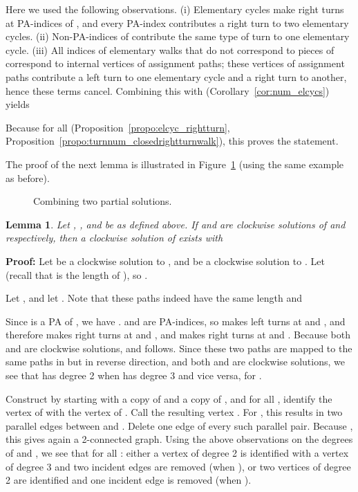 \documentclass{llncs}
\newcommand{\PF}{{\bf Proof: }}
\newcommand{\QED}{\hspace*{\fill}{}\medskip}
\newcommand{\Bo}{B'}
\newcommand{\Bt}{B''}
\newtheorem{lem}[thm]{Lemma}
\begin{document}
Here we used the following observations. (i) Elementary cycles make right turns at PA-indices of , and every PA-index contributes a right turn to two elementary cycles. (ii) Non-PA-indices of  contribute the same type of turn to one elementary cycle. (iii) All indices of elementary walks that do not correspond to pieces of  correspond to internal vertices of assignment paths; these vertices of assignment paths contribute a left turn to one elementary cycle and a right turn to another, hence these terms cancel.
Combining this with  (Corollary~\ref{cor:num_elcycs}) yields



Because  for all  (Proposition~\ref{propo:elcyc_rightturn}, Proposition~\ref{propo:turnnum_closedrightturnwalk}), this proves the statement.
\QED









\medskip

The proof of the next lemma is illustrated in Figure~\ref{fig:SGL} (using the same example as before).
\begin{figure}
\centering
\scalebox{0.9}{v'_1v'_3v'_2v''_2\Bt_x=v''_0v_0v_2v_4v''_1v''_3\Bo_0=v'_4v_3v_1\Bo_y=v''_4=\Bt_0v'_0H''H'H}
\caption{Combining two partial solutions.}
\label{fig:SGL}
\end{figure}
\begin{lem}
\label{lem:gluing-lemma}
Let , ,  and  be as defined above.
If  and  are clockwise solutions of  and  respectively, then a clockwise solution  of  exists with 

\end{lem}
\PF
Let  be a clockwise solution to , and  be a clockwise solution to . 
Let  (recall that  is the length of ), so .

Let , and let .
Note that these paths indeed have the same length  and

Since  is a PA of , we have .
 and  are PA-indices, so  makes left turns at  and , and therefore  makes right turns at  and , and  makes right turns at  and . Because both  and  are clockwise solutions,  and  follows.
Since these two paths are mapped to the same paths in  but in reverse direction, and both  and  are clockwise solutions, we see that  has degree 2 when  has degree 3 and vice versa, for .



Construct  by starting with a copy of  and a copy of , and for all , identify the vertex  of  with the vertex  of . Call the resulting vertex .
For , this results in two parallel edges between  and . Delete one edge of every such parallel pair. 
Because , this gives again a 2-connected graph.
Using the above observations on the degrees of  and , we see that  for all : either a vertex of degree 2 is identified with a vertex of degree 3 and two incident edges are removed (when ), or two vertices of degree 2 are identified and one incident edge is removed (when ).
\end{document}
